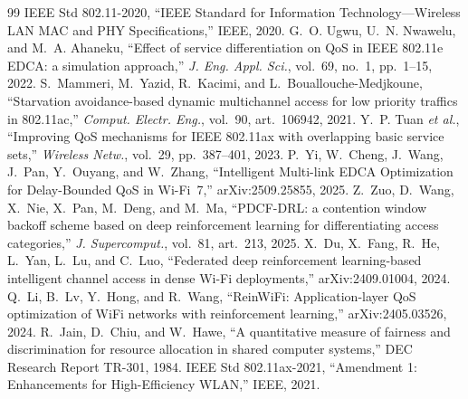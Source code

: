 \documentclass[conference]{IEEEtran}
\begin{document}
\begin{thebibliography}{99}
 IEEE Std 802.11-2020, ``IEEE Standard for Information
Technology---Wireless LAN MAC and PHY Specifications,'' IEEE, 2020.
 G.~O. Ugwu, U.~N. Nwawelu, and M.~A. Ahaneku, ``Effect of
service differentiation on QoS in IEEE 802.11e EDCA: a simulation approach,''
\emph{J. Eng. Appl. Sci.}, vol.~69, no.~1, pp.~1--15, 2022.
 S.~Mammeri, M.~Yazid, R.~Kacimi, and L.~Bouallouche-Medjkoune,
``Starvation avoidance-based dynamic multichannel access for low priority
traffics in 802.11ac,'' \emph{Comput. Electr. Eng.}, vol.~90, art.~106942, 2021.
 Y.~P. Tuan \emph{et al.}, ``Improving QoS mechanisms for IEEE
802.11ax with overlapping basic service sets,'' \emph{Wireless Netw.},
vol.~29, pp.~387--401, 2023.
 P.~Yi, W.~Cheng, J.~Wang, J.~Pan, Y.~Ouyang, and W.~Zhang,
``Intelligent Multi-link EDCA Optimization for Delay-Bounded QoS in Wi-Fi~7,''
arXiv:2509.25855, 2025.
 Z.~Zuo, D.~Wang, X.~Nie, X.~Pan, M.~Deng, and M.~Ma, ``PDCF-DRL:
a contention window backoff scheme based on deep reinforcement learning for
differentiating access categories,'' \emph{J. Supercomput.}, vol.~81,
art.~213, 2025.
 X.~Du, X.~Fang, R.~He, L.~Yan, L.~Lu, and C.~Luo, ``Federated deep
reinforcement learning-based intelligent channel access in dense Wi-Fi
deployments,'' arXiv:2409.01004, 2024.
 Q.~Li, B.~Lv, Y.~Hong, and R.~Wang, ``ReinWiFi: Application-layer
QoS optimization of WiFi networks with reinforcement learning,''
arXiv:2405.03526, 2024.
 R.~Jain, D.~Chiu, and W.~Hawe, ``A quantitative measure of
fairness and discrimination for resource allocation in shared computer
systems,'' DEC Research Report TR-301, 1984.
 IEEE Std 802.11ax-2021, ``Amendment 1: Enhancements for
High-Efficiency WLAN,'' IEEE, 2021.
\end{thebibliography}
\end{document}

